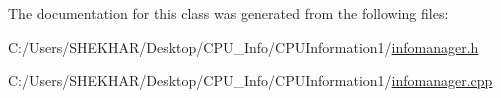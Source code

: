 The documentation for this class was generated from the following files\+:\begin{DoxyCompactItemize}
\item 
C\+:/\+Users/\+S\+H\+E\+K\+H\+A\+R/\+Desktop/\+C\+P\+U\+\_\+\+Info/\+C\+P\+U\+Information1/\hyperlink{infomanager_8h}{infomanager.\+h}\item 
C\+:/\+Users/\+S\+H\+E\+K\+H\+A\+R/\+Desktop/\+C\+P\+U\+\_\+\+Info/\+C\+P\+U\+Information1/\hyperlink{infomanager_8cpp}{infomanager.\+cpp}\end{DoxyCompactItemize}
